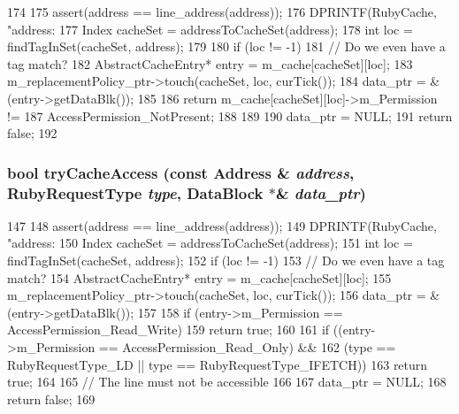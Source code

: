 \begin{DoxyCode}
174 {
175     assert(address == line_address(address));
176     DPRINTF(RubyCache, "address: %
177     Index cacheSet = addressToCacheSet(address);
178     int loc = findTagInSet(cacheSet, address);
179 
180     if (loc != -1) {
181         // Do we even have a tag match?
182         AbstractCacheEntry* entry = m_cache[cacheSet][loc];
183         m_replacementPolicy_ptr->touch(cacheSet, loc, curTick());
184         data_ptr = &(entry->getDataBlk());
185 
186         return m_cache[cacheSet][loc]->m_Permission !=
187             AccessPermission_NotPresent;
188     }
189 
190     data_ptr = NULL;
191     return false;
192 }
\end{DoxyCode}
\hypertarget{classCacheMemory_acfc92479973bfd11ae0191fd798ba44c}{
\subsubsection[{tryCacheAccess}]{\setlength{\rightskip}{0pt plus 5cm}bool tryCacheAccess (const {\bf Address} \& {\em address}, \/  RubyRequestType {\em type}, \/  {\bf DataBlock} $\ast$\& {\em data\_\-ptr})}}
\label{classCacheMemory_acfc92479973bfd11ae0191fd798ba44c}



\begin{DoxyCode}
147 {
148     assert(address == line_address(address));
149     DPRINTF(RubyCache, "address: %
150     Index cacheSet = addressToCacheSet(address);
151     int loc = findTagInSet(cacheSet, address);
152     if (loc != -1) {
153         // Do we even have a tag match?
154         AbstractCacheEntry* entry = m_cache[cacheSet][loc];
155         m_replacementPolicy_ptr->touch(cacheSet, loc, curTick());
156         data_ptr = &(entry->getDataBlk());
157 
158         if (entry->m_Permission == AccessPermission_Read_Write) {
159             return true;
160         }
161         if ((entry->m_Permission == AccessPermission_Read_Only) &&
162             (type == RubyRequestType_LD || type == RubyRequestType_IFETCH)) {
163             return true;
164         }
165         // The line must not be accessible
166     }
167     data_ptr = NULL;
168     return false;
169 }
\end{DoxyCode}



